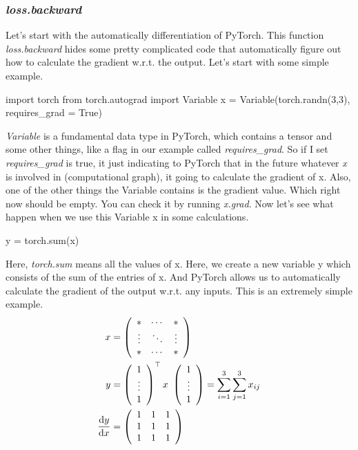 \subsubsection{\emph{loss.backward}}
Let's start with the automatically differentiation of PyTorch. This function \emph{loss.backward} hides some pretty complicated code that automatically figure out how to calculate the gradient w.r.t. the output.
Let's start with some simple example.
\begin{python}
import torch
from torch.autograd import Variable
x = Variable(torch.randn(3,3), requires_grad = True)
\end{python}
\emph{Variable} is a fundamental data type in PyTorch, which contains a tensor and some other things, like a flag in our example called \emph{requires\_grad}. So if I set \emph{requires\_grad} is true, it just indicating to PyTorch that in the future whatever \emph{x} is involved in (computational graph), it going to calculate the gradient of x. Also, one of the other things the Variable contains is the gradient value. Which right now should be empty. You can check it by running \emph{x.grad}. 
Now let's see what happen when we use this Variable x in some calculations.
\begin{python}
y = torch.sum(x)
\end{python}
Here, \emph{torch.sum} means all the values of x. Here, we create a new variable y which consists of the sum of the entries of x. And PyTorch allows us to automatically calculate the gradient of the output w.r.t. any inputs. This is an extremely simple example.
\begin{equation}
\begin{split}
x &= \left(\begin{array}{ccc} 
	* &\cdots &* \\
	\vdots &\ddots &\vdots \\
	* &\cdots &*
	\end{array}\right) \\
y &=  \left(\begin{array}{c} 
	1 \\ \vdots \\ 1
	\end{array}\right)^\top
	x\ 
	\left(\begin{array}{c} 
	1 \\ \vdots \\ 1
	\end{array}\right)
	=\sum_{i=1}^3 \sum_{j=1}^3 x_{ij} \\
\frac{{\rm d} y}{{\rm d} x} &= \left(\begin{array}{ccc} 
	1 &1 &1 \\
	1 &1 &1 \\
	1 &1 &1
	\end{array}\right) 
\end{split}
\end{equation}
